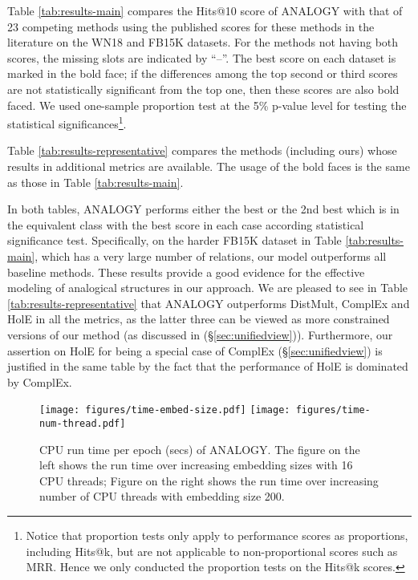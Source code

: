 \documentclass{article}
\begin{document}
Table \ref{tab:results-main} compares the Hits@10 score of ANALOGY with that of 23 competing methods using the published scores for these methods in the literature on the WN18 and FB15K datasets.  For the methods not having both scores, the missing slots are indicated by ``--''. 
The best score on each dataset is marked in the bold face; if the differences among the top second or third scores are not statistically significant from the top one, then these scores are also bold faced.  We used one-sample proportion test \cite{yang1999re} at the 5\% p-value level for testing the statistical significances\footnote{Notice that proportion tests only apply to performance scores as proportions, including Hits@k, but are not applicable to non-proportional scores such as MRR. Hence we only conducted the proportion tests on the Hits@k scores.}. 




Table \ref{tab:results-representative} compares the methods (including ours) whose results in additional metrics are available.
The usage of the bold faces is the same as those in Table \ref{tab:results-main}.


In both tables, ANALOGY performs either the best or the 2nd best which is in the equivalent class with the best score in each case according statistical significance test. Specifically, on the harder FB15K dataset in Table \ref{tab:results-main}, which has a very large number of relations, our model outperforms all baseline methods. These results provide a good evidence for the effective modeling of analogical structures in our approach.
We are pleased to see in Table \ref{tab:results-representative} that ANALOGY outperforms DistMult, ComplEx and HolE in all the metrics, as the latter three can be viewed as more constrained versions of our method (as discussed in (\S \ref{sec:unifiedview})). Furthermore, our assertion on HolE for being a special case of ComplEx (\S \ref{sec:unifiedview}) is justified in the same table by the fact that the performance of HolE is dominated by ComplEx. 

\begin{figure}
\centering
	\texttt{[image: figures/time-embed-size.pdf]}
    \texttt{[image: figures/time-num-thread.pdf]}
    \caption{CPU run time per epoch (secs) of ANALOGY. The figure on the left shows the run time over increasing embedding sizes with 16 CPU threads; Figure on the right shows the run time over increasing number of CPU threads with embedding size 200.}
    \label{fig:speed}
\end{figure}
\end{document}
